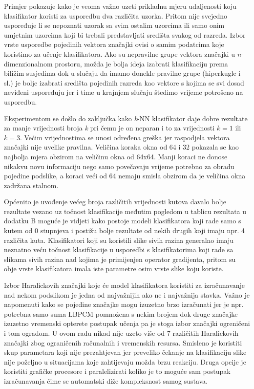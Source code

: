 \documentclass[times, utf8, zavrsni]{fer}
\begin{document}
\bigbreak

Primjer pokazuje kako je veoma važno uzeti prikladnu mjeru udaljenosti koju klasifikator koristi
za usporedbu dva različita uzorka. Pritom nije svejedno uspoređuje li se nepoznati 
uzorak sa svim ostalim uzorcima ili samo onim umjetnim uzorcima koji bi trebali
predstavljati središta svakog od razreda. Izbor vrste usporedbe pojedinih vektora
značajki ovisi o samim podatcima koje koristimo za učenje klasifikatora. Ako su nepravilne
grupe vektora značajki u \textit{n}-dimenzionalnom prostoru, možda je bolja ideja izabrati
klasifikaciju prema biližim susjedima dok u slučaju da imamo donekle pravilne grupe (hiperkugle i sl.) 
je bolje izabrati središta pojedinih razreda kao vektore s kojima se svi dosad neviđeni uspoređuju
jer i time u krajnjem slučaju štedimo vrijeme potrošeno na usporedbu. 

\bigbreak

Eksperimentom se došlo do zaključka kako \textit{k}-NN klasifikator daje dobre rezultate
za manje vrijednosti broja \textit{k} pri čemu je on neparan i to za vrijednosti \(k=1\) ili \(k=3\).
Većim vrijednostima se unosi određena greška jer raspodjela vektora značajki nije uvelike pravilna.
Veličina koraka okna od 64 i 32 pokazala se kao najbolja  mjera obzirom na veličinu okna od 64x64. 
Manji koraci ne donose nikakvu novu informaciju nego samo povečavaju vrijeme potrebno za 
obradu pojedine podslike, a koraci veći od 64 nemaju smisla obzirom da je veličina okna zadržana
stalnom. 

\bigbreak

Općenito je uvođenje većeg broja različitih vrijednosti kutova davalo bolje rezultate
vezano uz točnost klasifikacije međutim pogledom u tablicu rezultata u dodatku B moguće je 
vidjeti kako postoje modeli klasifikatora koji rade samo s kutem od 0 stupnjeva i postižu
bolje rezultate od nekih drugih koji imaju npr. 4 različita kuta. Klasifikatori koji su koristili
slike sivih razina generalno imaju neznatno veću točnost klasifikacije u usporedbi s klasifikatorima 
koji rade sa slikama sivih razina nad kojima je primijenjen operator gradijenta, pritom su obje vrste
klasifikatora imala iste parametre osim vrste slike koju koriste.

\bigbreak

Izbor Haralickovih značajki koje će model klasifikatora koristiti za izračunavanje nad nekom
podslikom je jedna od najvažnijih ako ne i najvažnija stavka. Važno je napomenuti kako se
pojedine značajke mogu izuzetno brzo izračunati jer je npr. potrebna samo suma LBPCM
pomnožena s nekim brojem dok druge značajke izuzetno vremenski opterete postupak 
učenja pa je stoga izbor značajki ogreničeni i tom ogradom. U ovom radu nikad nije uzeto
više od 7 različitih Haralickovih značajki zbog ograničenih računalnih i vremenskih resursa.
Smisleno je koristiti skup parametara koji nije prezahtjevan jer preveliko čekanje na klasifikaciju
slike nije poželjno u situacijama koje zahtijevaju možda brzu reakciju. Druga opcije je 
koristiti grafičke procesore i paralelizirati koliko je to moguće sam postupak izračunavanja
čime se automatski diže kompleksnost samog sustava.
\end{document}
